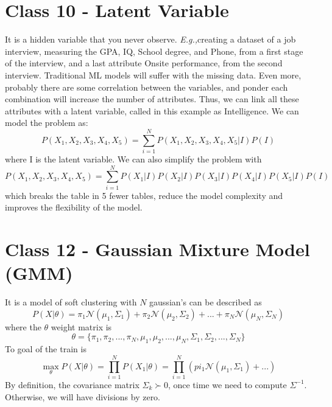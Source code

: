 \documentclass{article}
\newcommand{\Eg}{\textit{E.g.,}}
\begin{document}
\section{Class 10 - Latent Variable}
It is a hidden variable that you never observe. \Eg creating a dataset of a job interview, measuring the GPA, IQ, School degree, and Phone, from a first stage of the interview, and a last attribute Onsite performance, from the second interview. Traditional ML models will suffer with the missing data. Even more, probably there are some correlation between the variables, and ponder each combination will increase the number of attributes. Thus, we can link all these attributes with a latent variable, called in this example as Intelligence. We can model the problem as:
\begin{equation}
    P(X_1, X_2, X_3, X_4, X_5) = \sum_{i=1}^N P(X_1, X_2, X_3, X_4, X_5|I)P(I)
\end{equation}
where I is the latent variable. We can also simplify the problem with
\begin{equation}
    P(X_1, X_2, X_3, X_4, X_5) = \sum_{i=1}^N P(X_1|I)P(X_2|I)P(X_3|I)P(X_4|I)P(X_5|I)P(I)
\end{equation}
which breaks the table in 5 fewer tables, reduce the model complexity and improves the flexibility of the model.


\section{Class 12 - Gaussian Mixture Model (GMM)}
It is a model of soft clustering with $N$ gaussian's can be described as
\begin{equation}
    P(X|\theta) = \pi_1\mathcal{N}(\mu_1, \Sigma_1) + \pi_2\mathcal{N}(\mu_2, \Sigma_2) + ... + \pi_N\mathcal{N}(\mu_N, \Sigma_N)
\end{equation}
where the $\theta$ weight matrix is 
\begin{equation}
    \theta = \{\pi_1, \pi_2, ..., \pi_N, \mu_1, \mu_2, ..., \mu_N, \Sigma_1, \Sigma_2, ..., \Sigma_N\}
\end{equation}
To goal of the train is
\begin{equation}
    \max_\theta P(X|\theta) = \prod_{i=1}^N P(X_1|\theta) = \prod_{i=1}^N \left( pi_1\mathcal{N}(\mu_1, \Sigma_1) + ... \right)
\end{equation}
By definition, the covariance matrix $\Sigma_k \succ 0$, once time we need to compute $\Sigma^{-1}$. Otherwise, we will have divisions by zero.
\end{document}
